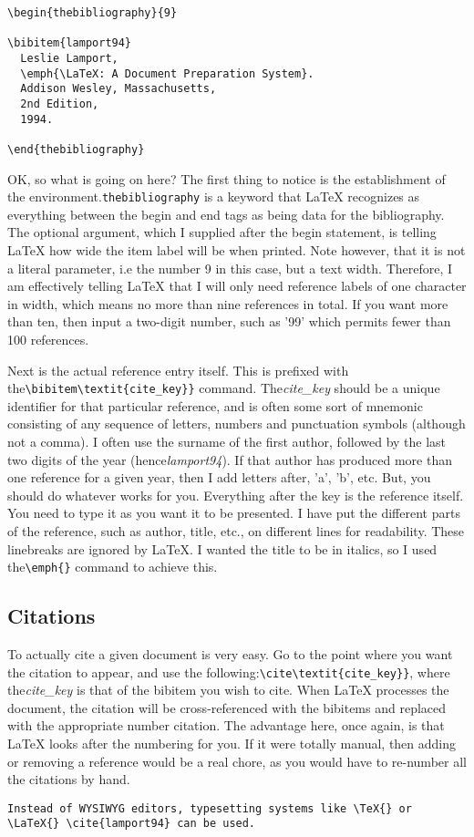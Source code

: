 \begin{lstlisting}
\begin{thebibliography}{9}

\bibitem{lamport94}
  Leslie Lamport,
  \emph{\LaTeX: A Document Preparation System}.
  Addison Wesley, Massachusetts,
  2nd Edition,
  1994.

\end{thebibliography}
\end{lstlisting}
OK, so what is going on here? The first thing to notice is the establishment of
the environment.\verb|thebibliography| is a keyword that LaTeX recognizes as
everything between the begin and end tags as being data for the bibliography.
The optional argument, which I supplied after the begin statement, is telling
LaTeX how wide the item label will be when printed. Note however, that it is
not a literal parameter, i.e the number 9 in this case, but a text width.
Therefore, I am effectively telling LaTeX that I will only need reference
labels of one character in width, which means no more than nine references in
total. If you want more than ten, then input a two-digit number, such as '99'
which permits fewer than 100 references.

Next is the actual reference entry itself. This is prefixed with
the\verb|\bibitem\textit{cite_key}}| command. The\textit{cite\_key} should be a
unique identifier for that particular reference, and is often some sort of
mnemonic consisting of any sequence of letters, numbers and punctuation symbols
(although not a comma). I often use the surname of the first author, followed
by the last two digits of the year (hence\textit{lamport94}). If that author
has produced more than one reference for a given year, then I add letters
after, 'a', 'b', etc. But, you should do whatever works for you. Everything
after the key is the reference itself. You need to type it as you want it to be
presented. I have put the different parts of the reference, such as author,
title, etc., on different lines for readability. These linebreaks are ignored
by LaTeX. I wanted the title to be in italics, so I used the\verb|\emph{}|
command to achieve this.

\subsection{Citations}
To actually cite a given document is very easy. Go to the point where you want
the citation to appear, and use the following:\verb|\cite\textit{cite_key}}|,
where the\textit{cite\_key} is that of the bibitem you wish to cite. When LaTeX
processes the document, the citation will be cross-referenced with the bibitems
and replaced with the appropriate number citation. The advantage here, once
again, is that LaTeX looks after the numbering for you. If it were totally
manual, then adding or removing a reference would be a real chore, as you would
have to re-number all the citations by hand.
\begin{lstlisting}
Instead of WYSIWYG editors, typesetting systems like \TeX{} or \LaTeX{} \cite{lamport94} can be used.
\end{lstlisting}

